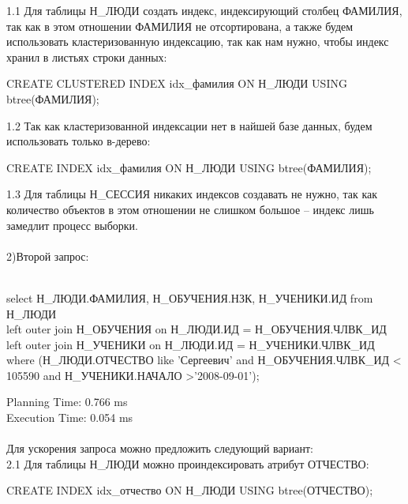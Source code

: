 \documentclass{article}
\begin{document}
1.1	Для таблицы Н\_ЛЮДИ создать индекс, индексирующий столбец ФАМИЛИЯ, так как в этом отношении ФАМИЛИЯ не отсортирована, а также будем использовать кластеризованную индексацию, так как нам нужно, чтобы индекс хранил в листьях строки данных:

\begin{center}
    CREATE CLUSTERED INDEX idx\_фамилия ON Н\_ЛЮДИ USING btree(ФАМИЛИЯ);
\end{center}


1.2 Так как кластеризованной индексации нет в найшей базе данных, будем использовать только в-дерево:

\begin{center}
    CREATE INDEX idx\_фамилия ON Н\_ЛЮДИ USING btree(ФАМИЛИЯ);
\end{center}


1.3 Для таблицы Н\_СЕССИЯ никаких индексов создавать не нужно, так как количество объектов в этом отношении не слишком большое – индекс лишь замедлит процесс выборки.
\\ \\
2)Второй запрос:\\
\\
\begin{center}
    select Н\_ЛЮДИ.ФАМИЛИЯ, Н\_ОБУЧЕНИЯ.НЗК, Н\_УЧЕНИКИ.ИД from Н\_ЛЮДИ\\
    left outer join Н\_ОБУЧЕНИЯ on Н\_ЛЮДИ.ИД = Н\_ОБУЧЕНИЯ.ЧЛВК\_ИД\\
    left outer join Н\_УЧЕНИКИ on Н\_ЛЮДИ.ИД = Н\_УЧЕНИКИ.ЧЛВК\_ИД\\
    where (Н\_ЛЮДИ.ОТЧЕСТВО like 'Сергеевич' and Н\_ОБУЧЕНИЯ.ЧЛВК\_ИД < 105590 and Н\_УЧЕНИКИ.НАЧАЛО >'2008-09-01');
\end{center}
Planning Time: 0.766 ms\\
Execution Time: 0.054 ms\\
\\
Для ускорения запроса можно предложить следующий вариант:\\


2.1 Для таблицы Н\_ЛЮДИ можно проиндексировать атрибут ОТЧЕСТВО:
\begin{center}
    CREATE INDEX idx\_отчество ON Н\_ЛЮДИ USING btree(ОТЧЕСТВО);
\end{center}
\end{document}
